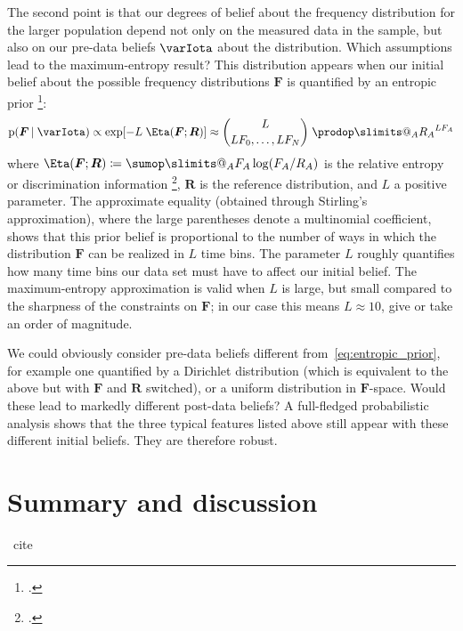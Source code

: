 \documentclass[\ifafour a4paper,12pt,\else a5paper,10pt,\fi%
onecolumn,oneside,article,%
british%
]{memoir}
\makeatletter
\theoremstyle{remark}
\theoremstyle{innote}
\def\sum{\DOTSI\sumop\slimits@}
\def\prod{\DOTSI\prodop\slimits@}
\newcommand*{\citep}{\footcites}
\newcommand*{\defd}{\coloneqq}
\newcommand*{\pf}{\mathrm{p}}%
\renewcommand*{\|}{\nonscript\,\vert\nonscript\;\mathopen{}}
\newcommand*{\puzzle}{{\fontencoding{U}\fontfamily{fontawesometwo}\selectfont\symbol{225}}}
\newcommand{\mynote}[1]{ {\color{notecolour}\puzzle\ #1}}
\newcommand*{\yAv}{A}
\newcommand*{\yFF}{F}
\newcommand*{\yF}{\bm{\yFF}}
\newcommand*{\yA}{\yAv}%
\newcommand*{\yI}{\varIota}
\newcommand*{\re}{\Eta}
\newcommand*{\yRR}{R}
\newcommand*{\yR}{\bm{\yRR}}
\newcommand*{\yL}{L}
\makeatother
\begin{document}
\medskip

The second point is that our degrees of belief about the frequency
distribution for the larger population depend not only on the measured data in
the sample, but also on our pre-data beliefs $\yI$ about the distribution.
Which assumptions lead to the maximum-entropy result? This distribution
appears when our initial belief about the possible frequency distributions
$\yF$ is quantified by an entropic prior
\citep{neumann2007,rodriguez1991,skilling1998,catichaetal2004,portamana2017}:
\begin{equation}
  \label{eq:entropic_prior}
  \pf(\yF \| \yI) \propto  \exp[-\yL\;\re(\yF;\yR)]
  \approx \binom{L}{L\yFF_{0}, \dotsc, L\yFF_{N}}\;
  \prod_{\yA}{\yRR_{\yA}}^{L\yFF_{\yA}}
\end{equation}
where $\re(\yF;\yR)\defd \sum_{\yA}\yFF_{\yA}\log(\yFF_{\yA}/\yRR_{\yA})$ is
the relative entropy or discrimination information
\citep{kullback1987,jaynes1963,hobson1969,hobsonetal1973}, $\yR$ is the
reference distribution, and $\yL$ a positive parameter. The approximate
equality (obtained through Stirling's approximation), where the large
parentheses denote a multinomial coefficient, shows that this prior belief
is proportional to the number of ways in which the distribution $\yF$ can
be realized in $L$ time bins. The parameter $L$ roughly quantifies how many
time bins our data set must have to affect our initial belief. The
maximum-entropy approximation is valid when $L$ is large, but small
compared to the sharpness of the constraints on $\yF$; in our case this
means $\yL \approx 10$, give or take an order of magnitude.

We could obviously consider pre-data beliefs different
from~\eqref{eq:entropic_prior}, for example one quantified by a Dirichlet
distribution (which is equivalent to the above but with $\yF$ and $\yR$
switched), or a uniform distribution in $\yF$-space. Would these lead to
markedly different post-data beliefs? A full-fledged probabilistic analysis
shows that the three typical features listed above still appear with these
different initial beliefs. They are therefore robust.




\section{Summary and discussion}
\label{sec:summary_discussion}


\mynote{cite  \cite[p.~440]{maxwell1873c}}
\end{document}
